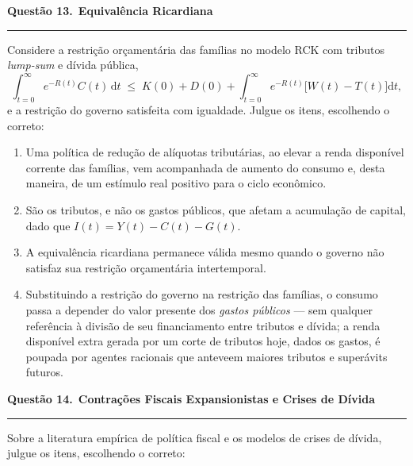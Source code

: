 \documentclass[12pt, a4paper]{article}
\newcommand{\dif}{\mathrm{d}}
\newcommand{\provaquestao}[2]{%
  \par\vspace{0.9em}%
  {\large\bfseries\color{cyanrbc} Questão #1.}\ {\bfseries #2}\par
  \vspace{-0.45em}\rule{\linewidth}{0.4pt}\par\vspace{0.1em}}
\begin{document}
\provaquestao{13}{Equivalência Ricardiana}

Considere a restrição orçamentária das famílias no modelo RCK com tributos
\emph{lump-sum} e dívida pública,
\[
\int_{t=0}^{\infty} e^{-R(t)} C(t)\,\dif t \;\leq\;
K(0) + D(0) + \int_{t=0}^{\infty} e^{-R(t)}\bigl[W(t) - T(t)\bigr]\dif t,
\]
e a restrição do governo satisfeita com igualdade. Julgue os itens, escolhendo
o correto:

\begin{enumerate}[label=\alph*)]
\item Uma política de redução de alíquotas tributárias, ao elevar a renda
disponível corrente das famílias, vem acompanhada de aumento do consumo e,
desta maneira, de um estímulo real positivo para o ciclo econômico.
\item São os tributos, e não os gastos públicos, que afetam a acumulação de
capital, dado que $I(t) = Y(t) - C(t) - G(t)$.
\item A equivalência ricardiana permanece válida mesmo quando o governo não
satisfaz sua restrição orçamentária intertemporal.
\item Substituindo a restrição do governo na restrição das famílias, o consumo
passa a depender do valor presente dos \emph{gastos públicos} --- sem qualquer
referência à divisão de seu financiamento entre tributos e dívida; a renda
disponível extra gerada por um corte de tributos hoje, dados os gastos, é
poupada por agentes racionais que anteveem maiores tributos e superávits
futuros.
\end{enumerate}

\provaquestao{14}{Contrações Fiscais Expansionistas e Crises de Dívida}

Sobre a literatura empírica de política fiscal e os modelos de crises de
dívida, julgue os itens, escolhendo o correto:
\end{document}
